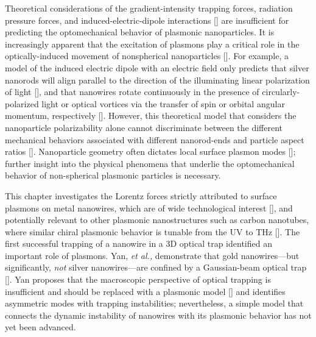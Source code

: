 Theoretical considerations of the gradient-intensity trapping forces, radiation pressure forces, and induced-electric-dipole interactions [\cite{Laboratories1997}] are insufficient for predicting the optomechanical behavior of plasmonic nanoparticles.  It is increasingly apparent that the excitation of plasmons play a critical role in the optically-induced movement of nonspherical nanoparticles [\cite{Yan2013}]. For example, a model of the induced electric dipole with an electric field only predicts that silver nanorods will align parallel to the direction of the illuminating linear polarization of light [\cite{Tong}], and that nanowires rotate continuously in the presence of circularly-polarized light or optical vortices via the transfer of spin or orbital angular momentum, respectively [\cite{Yan2013a, Lehmuskero1, Lehmuskero:14}]. However, this theoretical model that considers the nanoparticle polarizability alone cannot discriminate between the different mechanical behaviors associated with different nanorod-ends and particle aspect ratios [\cite{Tong}].  Nanoparticle geometry often dictates local surface plasmon modes [\cite{Knight2007}]; further insight into the physical phenomena that underlie the optomechanical behavior of non-spherical plasmonic particles is necessary.

This chapter investigates the Lorentz forces strictly attributed to surface plasmons on metal nanowires, which are of wide technological interest [\cite{Knight2007, Lal2007, Maier2005}], and potentially relevant to other plasmonic nanostructures such as carbon nanotubes, where similar chiral plasmonic behavior is tunable from the UV to THz [\cite{PhysRevBnanotube}]. The first successful trapping of a nanowire in a 3D optical trap identified an important role of plasmons. Yan, {\it et al.,} demonstrate that gold nanowires---but significantly, {\it not} silver nanowires---are confined by a Gaussian-beam optical trap [\cite{Yan2013}].  Yan proposes that the macroscopic perspective of optical trapping is insufficient and should be replaced with a plasmonic model [\cite{Yan2012}] and identifies asymmetric modes with trapping instabilities; nevertheless, a simple model that connects the dynamic instability of nanowires with its plasmonic behavior has not yet been advanced.

